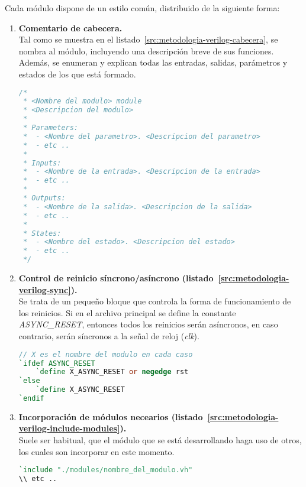 Cada módulo dispone de un estilo común, distribuido de la siguiente forma:
\begin{enumerate}
    \item{\textbf{Comentario de cabecera.}} \\
    Tal como se muestra en el listado~\ref{src:metodologia-verilog-cabecera}, se nombra al módulo, incluyendo una descripción breve de sus funciones. Además, se enumeran y explican todas las entradas, salidas, parámetros y estados de los que está formado.
    \begin{lstlisting}[language=Verilog,
        caption={Ejemplo de comentario de cabecera del módulo.},
        label=src:metodologia-verilog-cabecera]
/*
 * <Nombre del modulo> module
 * <Descripcion del modulo>
 *
 * Parameters:
 *  - <Nombre del parametro>. <Descripcion del parametro>
 *  - etc ..
 *
 * Inputs:
 *  - <Nombre de la entrada>. <Descripcion de la entrada>
 *  - etc ..
 *
 * Outputs:
 *  - <Nombre de la salida>. <Descripcion de la salida>
 *  - etc ..
 *
 * States:
 *  - <Nombre del estado>. <Descripcion del estado>
 *  - etc ..
 */
    \end{lstlisting}

    \item{\textbf{Control de reinicio síncrono/asíncrono (listado~\ref{src:metodologia-verilog-sync}).}} \\
    Se trata de un pequeño bloque que controla la forma de funcionamiento de los reinicios. Si en el archivo principal se define la constante \emph{ASYNC\_RESET}, entonces todos los reinicios serán asíncronos, en caso contrario, serán síncronos a la señal de reloj (\emph{clk}).
    \begin{lstlisting}[language=Verilog,
        caption={Ejemplo de control de reinicio síncrono/asíncrono.},
        label=src:metodologia-verilog-sync]
// X es el nombre del modulo en cada caso
`ifdef ASYNC_RESET
    `define X_ASYNC_RESET or negedge rst
`else
    `define X_ASYNC_RESET
`endif
    \end{lstlisting}
        
    \item{\textbf{Incorporación de módulos necearios (listado~\ref{src:metodologia-verilog-include-modules}).}} \\
    Suele ser habitual, que el módulo que se está desarrollando haga uso de otros, los cuales son incorporar en este momento.
    \begin{lstlisting}[language=Verilog,
        caption={Ejemplo de incorporación de módulos.},
        label=src:metodologia-verilog-include-modules]
`include "./modules/nombre_del_modulo.vh"
\\ etc ..
    \end{lstlisting}
        

\end{enumerate}
